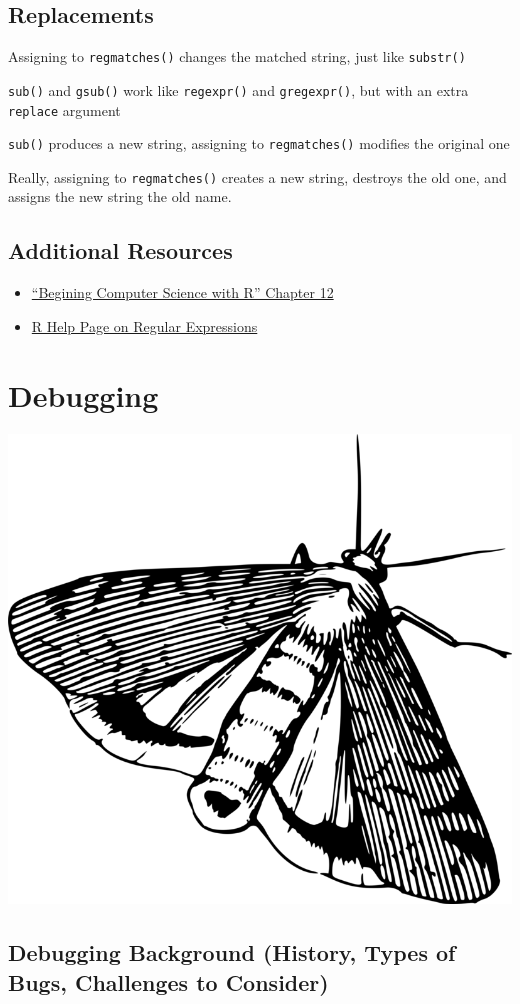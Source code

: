 \documentclass[
]{book}
\providecommand{\tightlist}{%
  \setlength{\itemsep}{0pt}\setlength{\parskip}{0pt}}
\begin{document}
\hypertarget{replacements}{%
\section{Replacements}\label{replacements}}

Assigning to \texttt{regmatches()} changes the matched string, just like \texttt{substr()}

\texttt{sub()} and \texttt{gsub()} work like \texttt{regexpr()} and \texttt{gregexpr()}, but with an extra \texttt{replace} argument

\texttt{sub()} produces a new string, assigning to \texttt{regmatches()} modifies the original one

Really, assigning to \texttt{regmatches()} creates a new string, destroys the old one, and assigns the new string the old name.

\hypertarget{additional-resources-8}{%
\section*{Additional Resources}\label{additional-resources-8}}

\begin{itemize}
\tightlist
\item
  \href{https://homerhanumat.github.io/r-notes/regex.html\#regex}{``Begining Computer Science with R'' Chapter 12}
\item
  \href{https://stat.ethz.ch/R-manual/R-devel/library/base/html/regex.html}{R Help Page on Regular Expressions}
\end{itemize}

\hypertarget{debugging}{%
\chapter{Debugging}\label{debugging}}

\begin{center}\includegraphics[width=0.25\linewidth]{images/moth} \end{center}

\hypertarget{debugging-background-history-types-of-bugs-challenges-to-consider}{%
\section{Debugging Background (History, Types of Bugs, Challenges to Consider)}\label{debugging-background-history-types-of-bugs-challenges-to-consider}}
\end{document}
